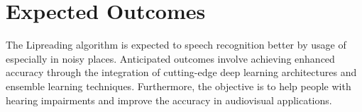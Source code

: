 \chapter{Expected Outcomes}
The Lipreading algorithm is expected to speech recognition better by usage of especially in noisy places. Anticipated outcomes involve achieving enhanced accuracy through the integration of cutting-edge deep learning architectures and ensemble learning techniques. Furthermore, the objective is to help people with hearing impairments and improve the accuracy in audiovisual applications.